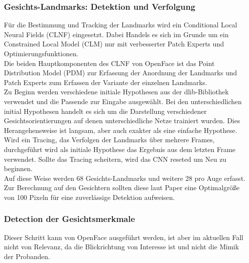 \subsubsection{Gesichts-Landmarks: Detektion und Verfolgung}
Für die Bestimmung und Tracking der Landmarks wird ein Conditional Local Neural Fields (CLNF) eingesetzt. Dabei Handels es sich im Grunde um ein Constrained Local Model (CLM) nur mit verbesserter Patch Experts und Optimierungsfunktionen.\\
Die beiden Hauptkomponenten des CLNF von OpenFace ist das Point Distribution Model (PDM) zur Erfassung der Anordnung der Landmarks und Patch Experts zum Erfassen der Variante der einzelnen Landmarks.\\
Zu Beginn werden verschiedene initiale Hypothesen aus der dlib-Bibliothek verwendet und die Passende zur Eingabe ausgewählt. Bei den unterschiedlichen initial Hypothesen handelt es sich um die Darstellung verschiedener Gesichtsorientierungen auf denen unterschiedliche Netze trainiert wurden. Dies Herangehensweise ist langsam, aber auch exakter als eine einfache Hypothese. Wird ein Tracing, das Verfolgen der Landmarks über mehrere Frames, durchgeführt wird als initiale Hypothese das Ergebnis aus dem letzten Frame verwendet. Sollte das Tracing scheitern, wird das CNN reseted um Neu zu beginnen.\\
Auf diese Weise werden 68 Gesichts-Landmarks und  weitere 28 pro Auge erfasst. Zur Berechnung auf den Gesichtern sollten diese laut Paper \cite{OpenFace} eine Optimalgröße von 100 Pixeln für eine zuverlässige Detektion aufweisen.
\subsubsection{Detection der Gesichtsmerkmale}
Dieser Schritt kann von OpenFace ausgeführt werden, ist aber im aktuellen Fall nicht von Relevanz, da die Blickrichtung von Interesse ist und nicht die Mimik der Probanden.
